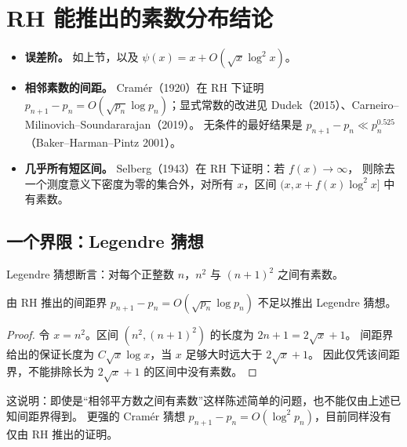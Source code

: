 \documentclass[11pt]{article}
\begin{document}
\section{RH 能推出的素数分布结论}
\begin{itemize}
 \item \textbf{误差阶。} 如上节，以及 $\psi(x)=x+O(\sqrt x\log^2x)$。
 \item \textbf{相邻素数的间距。} Cramér（1920）在 RH 下证明
 $p_{n+1}-p_n=O(\sqrt{p_n}\log p_n)$；显式常数的改进见 Dudek（2015）、Carneiro--Milinovich--Soundararajan（2019）。
 无条件的最好结果是 $p_{n+1}-p_n\ll p_n^{0.525}$（Baker--Harman--Pintz 2001）。
 \item \textbf{几乎所有短区间。} Selberg（1943）在 RH 下证明：若 $f(x)\to\infty$，
 则除去一个测度意义下密度为零的集合外，对所有 $x$，区间 $(x,x+f(x)\log^2x]$ 中有素数。
\end{itemize}

\subsection{一个界限：Legendre 猜想}
Legendre 猜想断言：对每个正整数 $n$，$n^2$ 与 $(n+1)^2$ 之间有素数。
\begin{proposition}\label{prop:legendre}
由 RH 推出的间距界 $p_{n+1}-p_n=O(\sqrt{p_n}\log p_n)$ 不足以推出 Legendre 猜想。
\end{proposition}
\begin{proof}
令 $x=n^2$。区间 $(n^2,(n+1)^2)$ 的长度为 $2n+1=2\sqrt x+1$。
间距界给出的保证长度为 $C\sqrt x\log x$，当 $x$ 足够大时远大于 $2\sqrt x+1$。
因此仅凭该间距界，不能排除长为 $2\sqrt x+1$ 的区间中没有素数。
\end{proof}
这说明：即使是“相邻平方数之间有素数”这样陈述简单的问题，也不能仅由上述已知间距界得到。
更强的 Cramér 猜想 $p_{n+1}-p_n=O(\log^2p_n)$，目前同样没有仅由 RH 推出的证明。
\end{document}
